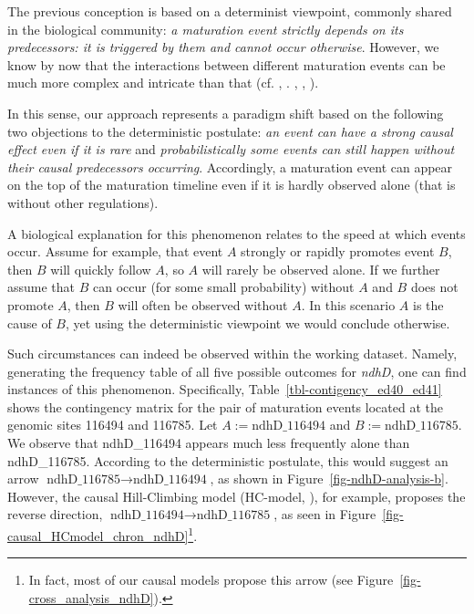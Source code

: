 \documentclass[
]{article}
\theoremstyle{definition}
\theoremstyle{remark}
\begin{document}
The previous conception is based on a determinist viewpoint, commonly
shared in the biological community: \emph{a maturation event strictly
depends on its predecessors: it is triggered by them and cannot occur
otherwise}. However, we know by now that the interactions between
different maturation events can be much more complex and intricate than
that (cf. ,
.
,
,
).

In this sense, our approach represents a paradigm shift based on the
following two objections to the deterministic postulate: \emph{an event
can have a strong causal effect even if it is rare} and
\emph{probabilistically some events can still happen without their
causal predecessors occurring}. Accordingly, a maturation event can
appear on the top of the maturation timeline even if it is hardly
observed alone (that is without other regulations).

A biological explanation for this phenomenon relates to the speed at
which events occur. Assume for example, that event \(A\) strongly or
rapidly promotes event \(B\), then \(B\) will quickly follow \(A\), so
\(A\) will rarely be observed alone. If we further assume that \(B\) can
occur (for some small probability) without \(A\) and \(B\) does not
promote \(A\), then \(B\) will often be observed without \(A\). In this
scenario \(A\) is the cause of \(B\), yet using the deterministic
viewpoint we would conclude otherwise.

Such circumstances can indeed be observed within the working dataset.
Namely, generating the frequency table of all five possible outcomes for
\emph{ndhD}, one can find instances of this phenomenon. Specifically,
Table~\ref{tbl-contigency_ed40_ed41} shows the contingency matrix for
the pair of maturation events located at the genomic sites 116494 and
116785. Let \(A:= \text{ndhD\_116494}\) and \(B:= \text{ndhD\_116785}\).
We observe that ndhD\_116494 appears much less frequently alone than
ndhD\_116785. According to the deterministic postulate, this would
suggest an arrow
\(\text{ndhD\_116785}\longrightarrow \text{ndhD\_116494}\), as shown in
Figure~\ref{fig-ndhD-analysis-b}. However, the causal Hill-Climbing
model (HC-model, ), for
example, proposes the reverse direction,
\(\text{ndhD\_116494}\longrightarrow \text{ndhD\_116785}\), as seen in
Figure~\ref{fig-causal_HCmodel_chron_ndhD}\footnote{In fact, most of our
  causal models propose this arrow (see
  Figure~\ref{fig-cross_analysis_ndhD}).}.
\end{document}
